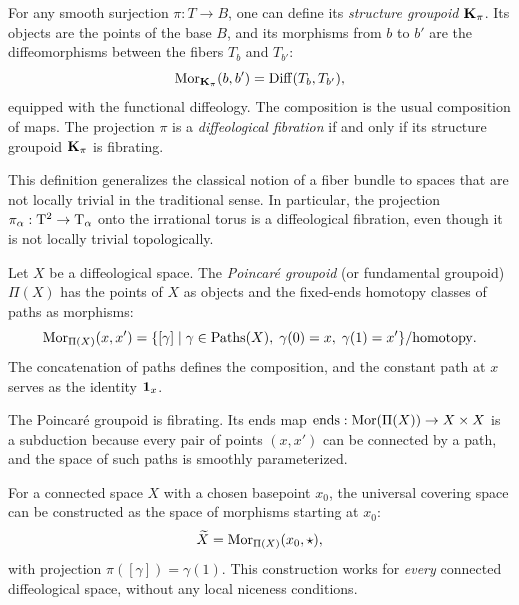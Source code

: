   \begin{article}
    For any smooth surjection $\pi: T \to B$,
    one can define its \emph{structure groupoid} ${\mathbf K}_\pi$.
    Its objects are the points of the base $B$,
    and its morphisms from $b$ to $b'$ are the diffeomorphisms between the fibers $T_b$ and $T_{b'}$:
    \[
      {\operatorname{Mor}}_{{\mathbf K}_\pi}(b,b') = \operatorname{Diff}(T_b, T_{b'}),
      \]
    equipped with the functional diffeology.
    The composition is the usual composition of maps.
    The projection $\pi$ is a \emph{diffeological fibration} if and only if its structure groupoid ${\mathbf K}_\pi$ is fibrating.
    
    This definition generalizes the classical notion of a fiber bundle to spaces that are not locally trivial in the traditional sense.
    In particular,
    the projection $\pi_\alpha: \mathrm{T}^2 \to \mathrm{T}_\alpha$ onto the irrational torus
    is a diffeological fibration,
    even though it is not locally trivial topologically.
  \end{article}
  
  \begin{article}
    Let $X$ be a diffeological space.
    The \emph{Poincaré groupoid} (or fundamental groupoid) $\Pi(X)$ has the points of $X$ as objects
    and the fixed-ends homotopy classes of paths as morphisms:
    \[
      {\operatorname{Mor}}_{\Pi(X)}(x,x') = \{ [\gamma] \mid \gamma \in \operatorname{Paths}(X), \; \gamma(0)=x,\; \gamma(1)=x' \}/\text{homotopy}.
      \]
    The concatenation of paths defines the composition,
    and the constant path at $x$ serves as the identity $\boldsymbol{1}_x$.
    
    The Poincaré groupoid is fibrating.
    Its ends map $\operatorname{ends}: {\operatorname{Mor}}(\Pi(X)) \to X \times X$ is a subduction because every pair of points $(x,x')$
    can be connected by a path,
    and the space of such paths is smoothly parameterized.
    
    For a connected space $X$ with a chosen basepoint $x_0$,
    the universal covering space can be constructed as the space of morphisms starting at $x_0$:
    \[
      \widetilde{X} = {\operatorname{Mor}}_{\Pi(X)}(x_0, \star),
      \]
    with projection $\pi([\gamma]) = \gamma(1)$.
    This construction works for \emph{every} connected diffeological space,
    without any local niceness conditions.
  \end{article}
  
